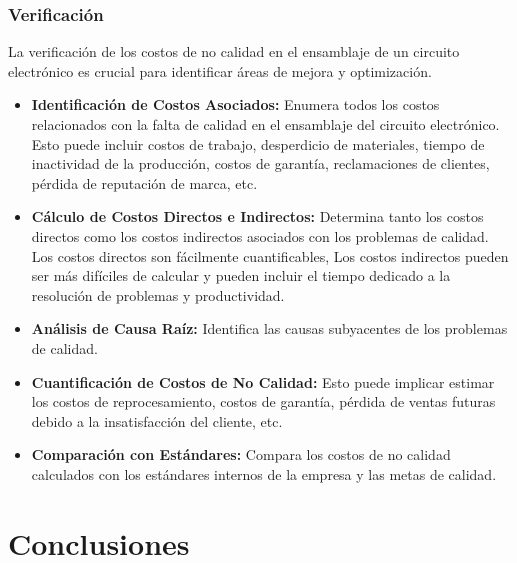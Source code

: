     \subsubsection{Verificación}
    La verificación de los costos de no calidad en el ensamblaje de un circuito electrónico es crucial para identificar áreas de mejora y optimización.
    \begin{itemize}
    \item \textbf{Identificación de Costos Asociados:} Enumera todos los costos relacionados con la falta de calidad en el ensamblaje del circuito electrónico. Esto puede incluir costos de trabajo, desperdicio de materiales, tiempo de inactividad de la producción, costos de garantía, reclamaciones de clientes, pérdida de reputación de marca, etc.
    
    \item \textbf{Cálculo de Costos Directos e Indirectos: }Determina tanto los costos directos como los costos indirectos asociados con los problemas de calidad. Los costos directos son fácilmente cuantificables, Los costos indirectos pueden ser más difíciles de calcular y pueden incluir el tiempo dedicado a la resolución de problemas y productividad.
    
    \item \textbf{Análisis de Causa Raíz:} Identifica las causas subyacentes de los problemas de calidad.
    
    \item \textbf{Cuantiﬁcación de Costos de No Calidad:} Esto puede implicar estimar los costos de reprocesamiento, costos de garantía, pérdida de ventas futuras debido a la insatisfacción del cliente, etc.
    
    \item \textbf{Comparación con Estándares:} Compara los costos de no calidad calculados con los estándares internos de la empresa y las metas de calidad.\cite{Pyzdek}
    \end{itemize}
    \section{Conclusiones}
    
